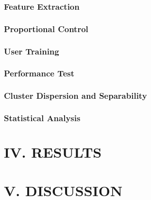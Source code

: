 \begin{multicols}{2}
	\subsubsection*{Feature Extraction}
	
	
%	 
	
	\subsubsection*{Proportional Control}
	
	
	\subsubsection*{User Training}
	
	
	\subsubsection*{Performance Test}
	
	
	\subsubsection*{Cluster Dispersion and Separability} 
	
	
	\subsubsection*{Statistical Analysis}
	
	
	\section*{IV. RESULTS}%
	
	
	
	\section*{V. DISCUSSION}%
	

\end{multicols}
